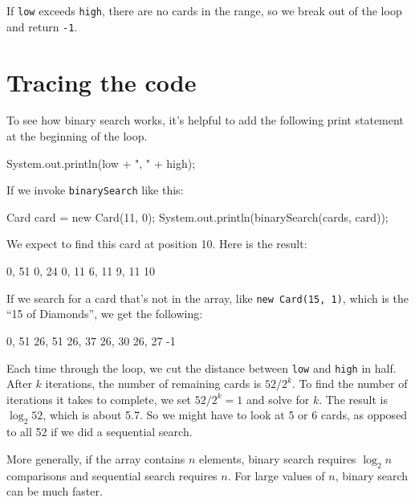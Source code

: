 \documentclass[12pt]{book}
\theoremstyle{exercise}
\newcommand{\java}[1]{\verb"#1"}
\begin{document}
If \java{low} exceeds \java{high}, there are no cards in the range, so we break out of the loop and return \java{-1}.


\section{Tracing the code}

To see how binary search works, it's helpful to add the following print statement at the beginning of the loop.

\begin{code}
    System.out.println(low + ", " + high);
\end{code}

If we invoke \java{binarySearch} like this:

\begin{code}
    Card card = new Card(11, 0);
    System.out.println(binarySearch(cards, card));
\end{code}

We expect to find this card at position 10.
Here is the result:

\begin{stdout}
0, 51
0, 24
0, 11
6, 11
9, 11
10
\end{stdout}

If we search for a card that's not in the array, like \java{new Card(15, 1)}, which is the ``15 of Diamonds'', we get the following:

\begin{stdout}
0, 51
26, 51
26, 37
26, 30
26, 27
-1
\end{stdout}

%

Each time through the loop, we cut the distance between \java{low} and \java{high} in half.
After $k$ iterations, the number of remaining cards is $52 / 2^k$.
To find the number of iterations it takes to complete, we set $52 / 2^k = 1$ and solve for $k$.
The result is $\log_2 52$, which is about 5.7.
So we might have to look at 5 or 6 cards, as opposed to all 52 if we did a sequential search.

More generally, if the array contains $n$ elements, binary search requires $\log_2 n$ comparisons and sequential search requires $n$.
For large values of $n$, binary search can be much faster.
\end{document}
